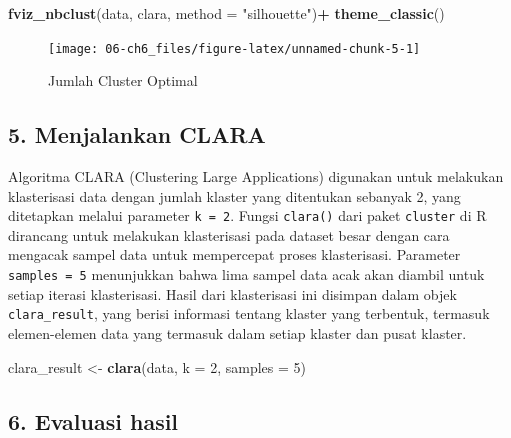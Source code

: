 \documentclass[
  oneside]{book}
\newenvironment{Shaded}{\begin{snugshade}}{\end{snugshade}}
\newcommand{\AttributeTok}[1]{\textcolor[rgb]{0.13,0.29,0.53}{#1}}
\newcommand{\DecValTok}[1]{\textcolor[rgb]{0.00,0.00,0.81}{#1}}
\newcommand{\FunctionTok}[1]{\textcolor[rgb]{0.13,0.29,0.53}{\textbf{#1}}}
\newcommand{\NormalTok}[1]{#1}
\newcommand{\OtherTok}[1]{\textcolor[rgb]{0.56,0.35,0.01}{#1}}
\newcommand{\SpecialCharTok}[1]{\textcolor[rgb]{0.81,0.36,0.00}{\textbf{#1}}}
\newcommand{\StringTok}[1]{\textcolor[rgb]{0.31,0.60,0.02}{#1}}
\begin{document}
\begin{Shaded}
\begin{Highlighting}[]
\FunctionTok{fviz\_nbclust}\NormalTok{(data, clara, }\AttributeTok{method =} \StringTok{"silhouette"}\NormalTok{)}\SpecialCharTok{+}
\FunctionTok{theme\_classic}\NormalTok{()}
\end{Highlighting}
\end{Shaded}

\begin{figure}[h]

{\centering \texttt{[image: 06-ch6\_files/figure-latex/unnamed-chunk-5-1]} 

}

\caption{Jumlah Cluster Optimal}\label{fig:unnamed-chunk-5}
\end{figure}

\subsection*{5. Menjalankan CLARA}\label{menjalankan-clara}

Algoritma CLARA (Clustering Large Applications) digunakan untuk melakukan klasterisasi data dengan jumlah klaster yang ditentukan sebanyak 2, yang ditetapkan melalui parameter \texttt{k\ =\ 2}. Fungsi \texttt{clara()} dari paket \texttt{cluster} di R dirancang untuk melakukan klasterisasi pada dataset besar dengan cara mengacak sampel data untuk mempercepat proses klasterisasi. Parameter \texttt{samples\ =\ 5} menunjukkan bahwa lima sampel data acak akan diambil untuk setiap iterasi klasterisasi. Hasil dari klasterisasi ini disimpan dalam objek \texttt{clara\_result}, yang berisi informasi tentang klaster yang terbentuk, termasuk elemen-elemen data yang termasuk dalam setiap klaster dan pusat klaster.

\begin{Shaded}
\begin{Highlighting}[]
\NormalTok{clara\_result }\OtherTok{\textless{}{-}} \FunctionTok{clara}\NormalTok{(data, }\AttributeTok{k =} \DecValTok{2}\NormalTok{, }\AttributeTok{samples =} \DecValTok{5}\NormalTok{)}
\end{Highlighting}
\end{Shaded}

\subsection*{6. Evaluasi hasil}\label{evaluasi-hasil}
\end{document}
